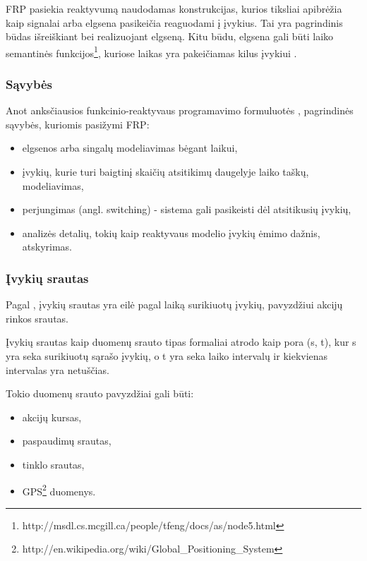 FRP pasiekia reaktyvumą naudodamas konstrukcijas, kurios tiksliai apibrėžia kaip signalai arba elgsena pasikeičia reaguodami į įvykius. Tai yra pagrindinis būdas išreiškiant bei realizuojant elgseną. Kitu būdu, elgsena gali būti laiko semantinės funkcijos\footnote{http://msdl.cs.mcgill.ca/people/tfeng/docs/as/node5.html}, kuriose laikas yra pakeičiamas kilus įvykiui \cite{Nilsson:2002:FRP:581690.581695}.

\subsubsection{Sąvybės}

Anot anksčiausios funkcinio-reaktyvaus programavimo formuluotės \cite{ElliottHudak97:Fran}, pagrindinės sąvybės, kuriomis pasižymi FRP:

\begin{itemize}

	\item elgsenos arba singalų modeliavimas bėgant laikui,

	\item įvykių, kurie turi baigtinį skaičių atsitikimų daugelyje laiko taškų, modeliavimas,

	\item perjungimas (angl. switching) - sistema gali pasikeisti dėl atsitikusių įvykių,

	\item analizės detalių, tokių kaip reaktyvaus modelio įvykių ėmimo dažnis, atskyrimas.

\end{itemize}

\subsubsection{Įvykių srautas}

Pagal \cite{Bass:2007:Mythbusters}, įvykių srautas yra eilė pagal laiką surikiuotų įvykių, pavyzdžiui akcijų rinkos srautas.

Įvykių srautas kaip duomenų srauto tipas formaliai atrodo kaip pora (s, t), kur s yra seka surikiuotų sąrašo įvykių, o t yra seka laiko intervalų ir kiekvienas intervalas yra netuščias.

Tokio duomenų srauto pavyzdžiai gali būti:

\begin{itemize}

	\item akcijų kursas,

	\item paspaudimų srautas,

	\item tinklo srautas,

	\item GPS\footnote{http://en.wikipedia.org/wiki/Global\_Positioning\_System} duomenys.

\end{itemize}

